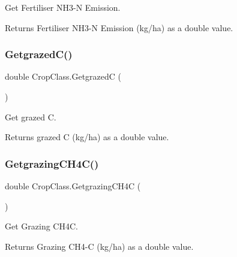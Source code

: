 Get Fertiliser N\+H3-\/N Emission. 

\begin{DoxyReturn}{Returns}
Fertiliser N\+H3-\/N Emission (kg/ha) as a double value. 
\end{DoxyReturn}
\mbox{\label{class_crop_class_a9f531980e408497281cad53ff637324f}} 
\subsubsection{\texorpdfstring{GetgrazedC()}{GetgrazedC()}}
{\footnotesize\ttfamily double Crop\+Class.\+GetgrazedC (\begin{DoxyParamCaption}{ }\end{DoxyParamCaption})\hspace{0.3cm}{\ttfamily [inline]}}



Get grazed C. 

\begin{DoxyReturn}{Returns}
grazed C (kg/ha) as a double value. 
\end{DoxyReturn}
\mbox{\label{class_crop_class_af1de6b2cbc183ba46bf279fe04a32173}} 
\subsubsection{\texorpdfstring{GetgrazingCH4C()}{GetgrazingCH4C()}}
{\footnotesize\ttfamily double Crop\+Class.\+Getgrazing\+C\+H4C (\begin{DoxyParamCaption}{ }\end{DoxyParamCaption})\hspace{0.3cm}{\ttfamily [inline]}}



Get Grazing C\+H4C. 

\begin{DoxyReturn}{Returns}
Grazing C\+H4-\/C (kg/ha) as a double value. 
\end{DoxyReturn}
\mbox{\label{class_crop_class_a29b529cfa76d83e21ab69dba9d127fdd}} 
